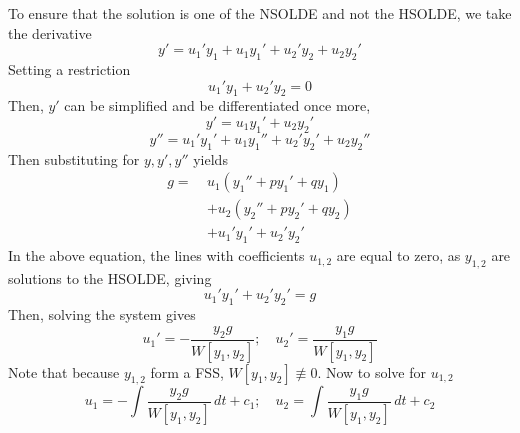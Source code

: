 \documentclass[diffeq.tex]{subfiles}
\begin{document}
    \begin{proof*}[14.1]
        To ensure that the solution is one of the NSOLDE and not the HSOLDE, we take the derivative
        \begin{equation}
            y' = u_{1}'y_{1} + u_{1}y_{1}' + u_{2}'y_{2} + u_{2}y_{2}'
        \end{equation}
        Setting a restriction
        \begin{equation}
            u_{1}'y_{1} + u_{2}'y_{2} = 0
        \end{equation}
        Then, $y'$ can be simplified and be differentiated once more,
        \begin{equation}
            y' = u_{1}y_{1}' + u_{2}y_{2}'
        \end{equation}
        \begin{equation}
            y'' = u_{1}'y_{1}' + u_{1}y_{1}'' + u_{2}'y_{2}' + u_{2}y_{2}''
        \end{equation}
        Then substituting for $y, y', y''$ yields
        \begin{equation}
            \begin{alignedat}{1}
                g =\ &u_{1}\left(y_{1}'' + py_{1}' + qy_{1}\right)\\
                &+u_{2}\left(y_{2}'' + py_{2}' + qy_{2}\right)\\
                &+u_{1}'y_{1}' + u_{2}'y_{2}'
            \end{alignedat}
        \end{equation}
        In the above equation, the lines with coefficients $u_{1,2}$ are equal to zero, as $y_{1,2}$ are solutions to the HSOLDE, giving
        \begin{equation}
            u_{1}'y_{1}' + u_{2}'y_{2}' = g
        \end{equation}
        Then, solving the system gives
        \begin{equation}
            u_{1}' = -\frac{y_{2}g}{W[y_{1}, y_{2}]};\quad u_{2}' = \frac{y_{1}g}{W[y_{1}, y_{2}]}
        \end{equation}
        Note that because $y_{1,2}$ form a FSS, $W[y_{1}, y_{2}] \nequiv 0$. Now to solve for $u_{1,2}$
        \begin{equation}
            u_{1} = -\int \frac{y_{2}g}{W[y_{1},y_{2}]}\,dt + c_{1};\quad u_{2} = \int \frac{y_{1}g}{W[y_{1},y_{2}]}\,dt + c_{2}
        \end{equation}
    \end{proof*}
\end{document}
